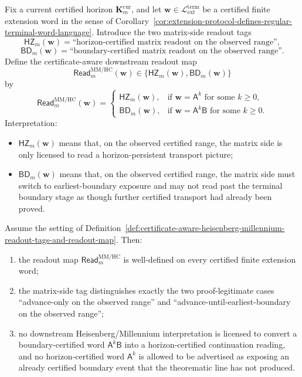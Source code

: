 \begin{definition}
\label{def:certificate-aware-heisenberg-millennium-readout-tags-and-readout-map}
Fix a current certified horizon \(\mathbf K_m^{\mathrm{cur}}\), and let \(\mathbf w\in \mathcal L_{\mathrm{ext}}^{\mathrm{term}}\) be a certified finite extension word in the sense of Corollary~\ref{cor:extension-protocol-defines-regular-terminal-word-language}. Introduce the two matrix-side readout tags
\[
 \mathsf{HZ}_{m}(\mathbf w) = \text{``horizon-certified matrix readout on the observed range''},
\]
\[
 \mathsf{BD}_{m}(\mathbf w) = \text{``boundary-certified matrix readout on the observed range''}.
\]
Define the certificate-aware downstream readout map
\[
 \mathsf{Read}^{\mathrm{MM/HC}}_{m}(\mathbf w)
 \in
 \{\mathsf{HZ}_{m}(\mathbf w),\mathsf{BD}_{m}(\mathbf w)\}
\]
by
\[
 \mathsf{Read}^{\mathrm{MM/HC}}_{m}(\mathbf w)
 =
 \begin{cases}
 \mathsf{HZ}_{m}(\mathbf w), & \text{if }\mathbf w=\mathsf A^k\text{ for some }k\ge 0,\\[2mm]
 \mathsf{BD}_{m}(\mathbf w), & \text{if }\mathbf w=\mathsf A^k\mathsf B\text{ for some }k\ge 0.
 \end{cases}
\]
Interpretation:
\begin{itemize}[leftmargin=2em]
 \item \(\mathsf{HZ}_{m}(\mathbf w)\) means that, on the observed certified range, the matrix side is only licensed to read a horizon-persistent transport picture;
 \item \(\mathsf{BD}_{m}(\mathbf w)\) means that, on the observed certified range, the matrix side must switch to earliest-boundary exposure and may not read past the terminal boundary stage as though further certified transport had already been proved.
\end{itemize}
\end{definition}

\begin{proposition}
\label{prop:certificate-aware-matrix-readout-is-faithful-to-certified-extension-language}
Assume the setting of Definition~\ref{def:certificate-aware-heisenberg-millennium-readout-tags-and-readout-map}. Then:
\begin{enumerate}[label=(\roman*)]
 \item the readout map \(\mathsf{Read}^{\mathrm{MM/HC}}_{m}\) is well-defined on every certified finite extension word;
 \item the matrix-side tag distinguishes exactly the two proof-legitimate cases ``advance-only on the observed range'' and ``advance-until-earliest-boundary on the observed range'';
 \item no downstream Heisenberg/Millennium interpretation is licensed to convert a boundary-certified word \(\mathsf A^k\mathsf B\) into a horizon-certified continuation reading, and no horizon-certified word \(\mathsf A^k\) is allowed to be advertised as exposing an already certified boundary event that the theorematic line has not produced.
\end{enumerate}
\end{proposition}

